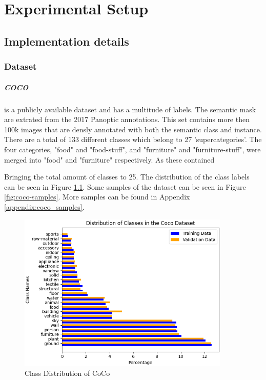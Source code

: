 \chapter{Experimental Setup}\label{chapter:second_real_chapter}

\section{Implementation details}
\subsection{Dataset}
\paragraph{COCO\cite{lin2015microsoftcococommonobjects}} is a publicly available dataset and has a multitude of labels. The semantic mask are extrated from the 2017 Panoptic annotations. This set contains more then 100k images that are densly annotated with both the semantic class and instance. There are a total of 133 different classes which belong to 27 'supercategories'. The four categories, "food" and "food-stuff", and "furniture" and "furniture-stuff", were merged into "food" and "furniture" respectively. As these contained 

Bringing the total amount of classes to 25. The distribution of the class labels can be seen in Figure \ref{fig:coco-class-distribution}. Some samples of the dataset can be seen in Figure \ref{fig:coco-samples}. More samples can be found in Appendix \ref{appendix:coco_samples}. 

\begin{figure}[h]
    \centering
    \includegraphics[width=0.9\textwidth]{figures/datasets/coco/class_distribution.png}
    \caption{Class Distribution of CoCo}
    \label{fig:coco-class-distribution}
\end{figure}

